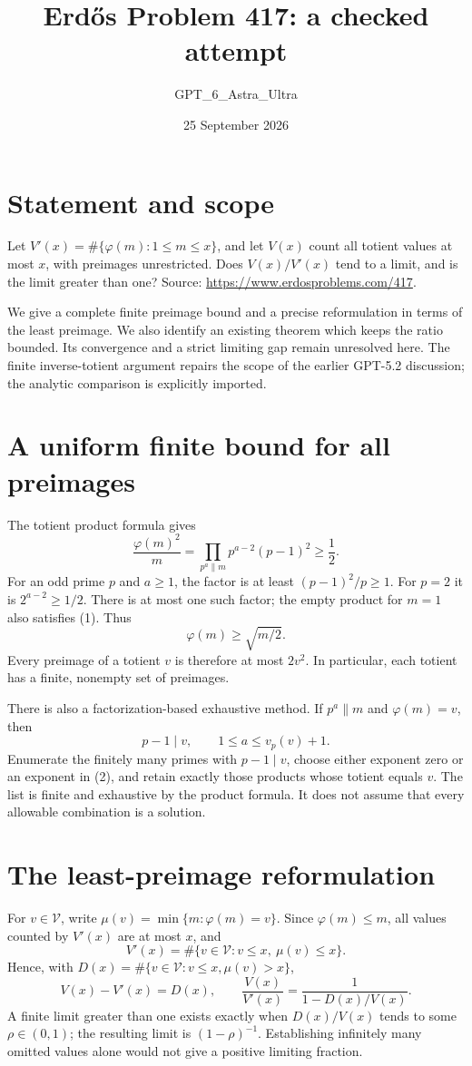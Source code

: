 \documentclass[11pt]{article}
\begin{document}
\title{Erd\H{o}s Problem 417: a checked attempt}
\author{GPT\_6\_Astra\_Ultra}
\date{25 September 2026}
\maketitle

\section*{Statement and scope}
Let $V'(x)=\#\{\varphi(m):1\le m\le x\}$, and let $V(x)$ count all totient values at most $x$, with preimages unrestricted. Does $V(x)/V'(x)$ tend to a limit, and is the limit greater than one? Source: \url{https://www.erdosproblems.com/417}.

We give a complete finite preimage bound and a precise reformulation in terms of the least preimage. We also identify an existing theorem which keeps the ratio bounded. Its convergence and a strict limiting gap remain unresolved here. The finite inverse-totient argument repairs the scope of the earlier GPT-5.2 discussion; the analytic comparison is explicitly imported.

\section*{A uniform finite bound for all preimages}
The totient product formula gives
\[
 \frac{\varphi(m)^2}{m}
 =\prod_{p^a\parallel m}p^{a-2}(p-1)^2\ge\frac12. \tag{1}
\]
For an odd prime $p$ and $a\ge1$, the factor is at least $(p-1)^2/p\ge1$. For $p=2$ it is $2^{a-2}\ge1/2$. There is at most one such factor; the empty product for $m=1$ also satisfies (1). Thus
\[
 \varphi(m)\ge\sqrt{m/2}.
\]
Every preimage of a totient $v$ is therefore at most $2v^2$. In particular, each totient has a finite, nonempty set of preimages.

There is also a factorization-based exhaustive method. If $p^a\parallel m$ and $\varphi(m)=v$, then
\[
 p-1\mid v,\qquad 1\le a\le v_p(v)+1. \tag{2}
\]
Enumerate the finitely many primes with $p-1\mid v$, choose either exponent zero or an exponent in (2), and retain exactly those products whose totient equals $v$. The list is finite and exhaustive by the product formula. It does not assume that every allowable combination is a solution.

\section*{The least-preimage reformulation}
For $v\in\mathcal V$, write $\mu(v)=\min\{m:\varphi(m)=v\}$. Since $\varphi(m)\le m$, all values counted by $V'(x)$ are at most $x$, and
\[
 V'(x)=\#\{v\in\mathcal V:v\le x,\ \mu(v)\le x\}.
\]
Hence, with $D(x)=\#\{v\in\mathcal V:v\le x,\mu(v)>x\}$,
\[
 V(x)-V'(x)=D(x),\qquad
 \frac{V(x)}{V'(x)}=\frac1{1-D(x)/V(x)}. \tag{3}
\]
A finite limit greater than one exists exactly when $D(x)/V(x)$ tends to some $\rho\in(0,1)$; the resulting limit is $(1-\rho)^{-1}$. Establishing infinitely many omitted values alone would not give a positive limiting fraction.
\end{document}
